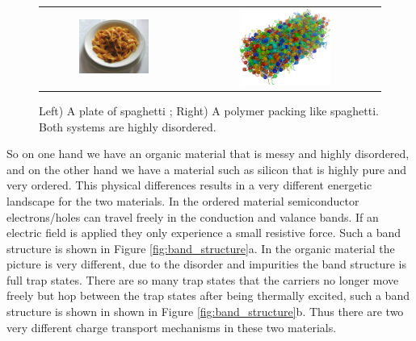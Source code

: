 \begin{figure}[H]
\centering
\begin{tabular}{ c c }


\includegraphics[width=0.5\textwidth,height=0.4\textwidth]{./images/electrical/spaghetti.jpg}

&
\includegraphics[width=0.5\textwidth,height=0.4\textwidth]{./images/electrical/polymer.png}
\\
\end{tabular}
\caption{Left) A plate of spaghetti \cite{image_spaghetti}; Right) A polymer packing like spaghetti. Both systems are highly disordered.}
\label{fig:disorder}
\end{figure}

So on one hand we have an organic material that is messy and highly disordered, and on the other hand we have a material such as silicon that is highly pure and very ordered.  This physical differences results in a very different energetic landscape for the two materials. In the ordered material semiconductor electrons/holes can travel freely in the conduction and valance bands. If an electric field is applied they only experience a small resistive force. Such a band structure is shown in Figure \ref{fig:band_structure}a. In the organic material the picture is very different, due to the disorder and impurities the band structure is full trap states. There are so many trap states that the carriers no longer move freely but hop between the trap states after being thermally excited, such a band structure is shown in shown in Figure \ref{fig:band_structure}b. Thus there are two very different charge transport mechanisms in these two materials.


